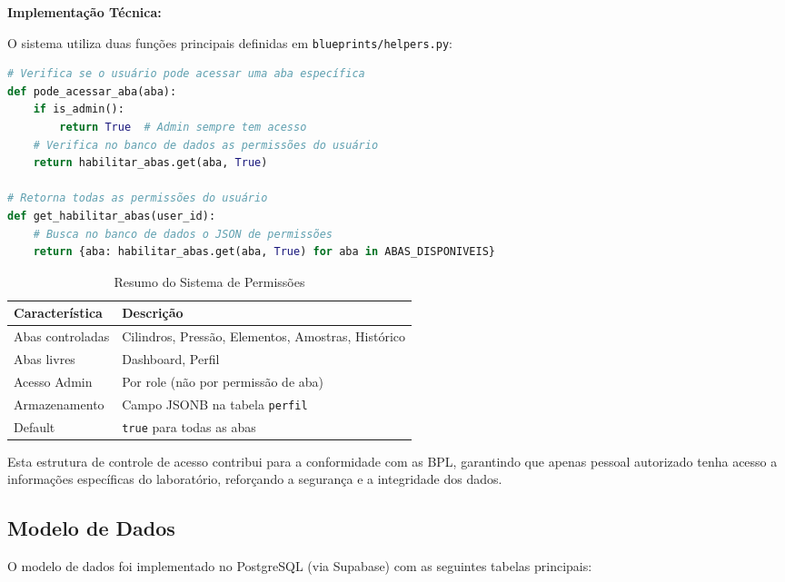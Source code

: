 \documentclass[12pt,a4paper]{article}
\providecommand\关键字[1]{\textbf{#1}}
\begin{document}
\textbf{Implementação Técnica:}

O sistema utiliza duas funções principais definidas em \texttt{blueprints/helpers.py}:

\begin{lstlisting}[language=Python, caption=Funções de Permissão]
# Verifica se o usuário pode acessar uma aba específica
def pode_acessar_aba(aba):
    if is_admin():
        return True  # Admin sempre tem acesso
    # Verifica no banco de dados as permissões do usuário
    return habilitar_abas.get(aba, True)

# Retorna todas as permissões do usuário
def get_habilitar_abas(user_id):
    # Busca no banco de dados o JSON de permissões
    return {aba: habilitar_abas.get(aba, True) for aba in ABAS_DISPONIVEIS}
\end{lstlisting}

\begin{table}[h!]
\centering
\caption{Resumo do Sistema de Permissões}
\label{tab:resumo-permissoes}
\begin{tabular}{@{}ll@{}}
\toprule
\textbf{Característica} & \textbf{Descrição} \\
\midrule
Abas controladas & Cilindros, Pressão, Elementos, Amostras, Histórico \\
Abas livres & Dashboard, Perfil \\
Acesso Admin & Por role (não por permissão de aba) \\
Armazenamento & Campo JSONB na tabela \texttt{perfil} \\
Default & \texttt{true} para todas as abas \\
\bottomrule
\end{tabular}
\end{table}

Esta estrutura de controle de acesso contribui para a conformidade com as BPL, garantindo que apenas pessoal autorizado tenha acesso a informações específicas do laboratório, reforçando a segurança e a integridade dos dados.

\subsection{Modelo de Dados}

O modelo de dados foi implementado no PostgreSQL (via Supabase) com as seguintes tabelas principais:
\end{document}
